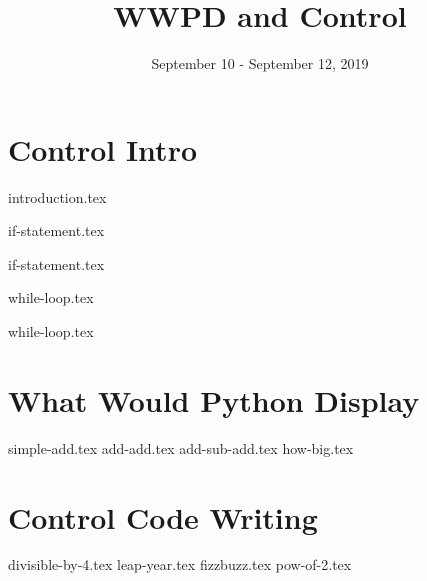\documentclass{exam}
\title{WWPD and Control}
\date{September 10 - September 12, 2019}
\begin{document}
\maketitle
\section{Control Intro}
{introduction.tex}

{if-statement.tex}

{if-statement.tex}

{while-loop.tex}

{while-loop.tex}


\section{What Would Python Display}
\begin{questions}
{simple-add.tex}
{add-add.tex}
{add-sub-add.tex}
{how-big.tex}

\end{questions}
\newpage
\section{Control Code Writing}
\begin{questions}
{divisible-by-4.tex}
{leap-year.tex}
{fizzbuzz.tex}
{pow-of-2.tex}
\end{questions}
\end{document}
